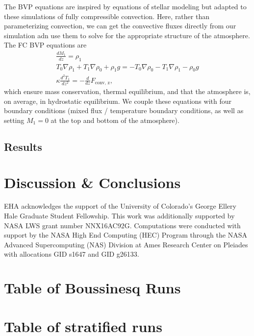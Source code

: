 \documentclass[aps, pre, onecolumn, nofootinbib, notitlepage, groupedaddress, amsfonts, amssymb, amsmath, longbibliography]{revtex4-1}
\newcommand{\grad}{\ensuremath{\nabla}}
\begin{document}
The BVP equations are inspired by equations of stellar modeling  \cite{paxton&all2011} but adapted to these simulations
of fully compressible convection.  Here, rather than parameterizing convection, we can get the
convective fluxes directly from our simulation adn use them to solve for the appropriate structure
of the atmosphere.  The FC BVP equations are
\begin{gather}
\frac{d M_1}{dz} = \rho_1 \\
T_0 \grad \rho_1 + T_1 \grad \rho_0 + \rho_1 g = - T_0 \grad \rho_0 - T_1 \grad \rho_1 - \rho_0 g \\
\kappa \frac{d^2 T_1}{d z^2} = -\frac{d}{dz}F_{\text{conv, z}},
\end{gather}
which ensure mass conservation, thermal equilibrium, and that the atmosphere is, on average,
in hydrostatic equilibrium.  We couple these equations with four boundary conditions (mixed
flux / temperature boundary conditions, as well as setting $M_1 = 0$ at the top and bottom
of the atmosphere).

\subsection{Results}





\section{Discussion \& Conclusions}
\label{sec:results}




\begin{acknowledgments}
EHA acknowledges the support of the University of Colorado's George 
Ellery Hale Graduate Student Fellowship.
This work was additionally supported by  NASA LWS grant number NNX16AC92G.  
Computations were conducted 
with support by the NASA High End Computing (HEC) Program through the NASA 
Advanced Supercomputing (NAS) Division at Ames Research Center on Pleiades
with allocations GID s1647 and GID g26133.
\end{acknowledgments}


\appendix
\section{Table of Boussinesq Runs}



\section{Table of stratified runs}



\end{document}
